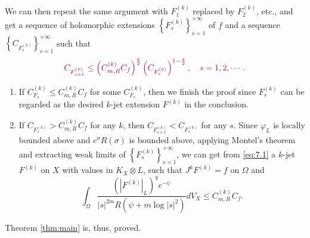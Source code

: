 \documentclass[lang=en,12pt,twoside]{textbook}
\begin{document}
We can then repeat the same argument with $F_1^{(k)}$ replaced by $F_2^{(k)}$, etc., and get a sequence of holomorphic extensions $\left\{F_s^{(k)}\right\}_{s=1}^{+\infty}$ of $f$ and a sequence $\left\{C_{F_s^{(k)}}\right\}_{s=1}^{+\infty}$ such that
\begin{equation}\label{eq:7.1}\color{purple}
  C_{F_{s+1}^{(k)}} \leq\left(C_{m,R}^{(k)} C_f\right)^{\frac{q}{2}}\left(C_{F_s^{(k)}}\right)^{1-\frac{q}{2}}, \quad s=1,2, \cdots .
\end{equation}
\begin{enumerate}[label=(\Roman*)]
  \item If $C_{F_s}^{(k)} \leq C_{m,R}^{(k)} C_f$ for some $C_{F_s}^{(k)}$, then we finish the proof since $F_s^{(k)}$ can be regarded as the desired $k$-jet  extension $F^{(k)}$ in the conclusion.
  \item If $C_{F_s^{(k)}}>C_{m,R}^{(k)} C_f$ for any $k$, then $C_{F_{s+1}^{(k)}}<C_{F_s^{(k)}}$ for any $s$. Since $\varphi_L$ is locally bounded above and $e^\sigma R(\sigma)$ is bounded above, applying Montel's theorem and extracting weak limits of $\left\{F_s^{(k)}\right\}_{s=1}^{+\infty}$, we can get from \eqref{eq:7.1} a $k$-jet $F^{(k)}$  on $X$ with values in $K_X \otimes L$, such that $J^k F^{(k)}=f$ on $\Omega$ and
$$
\int_\Omega \frac{\left(|F^{(k)}|_L\right)^q e^{-\psi}}{|s|^{2m} R(\psi+m\log |s|^2)} d V_X \leq C_{m,R}^{(k)}C_f .
$$
\end{enumerate}
Theorem \ref{thm:main} is, thus, proved.






%
\printbibliography[heading=bibintoc]
\end{document}
